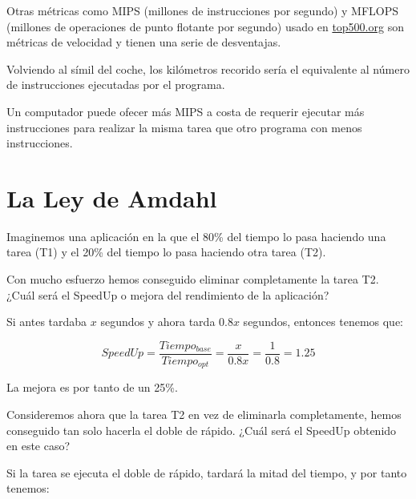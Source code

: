 \documentclass[12pt,onecolumn]{memoir}
\begin{document}
Otras métricas como MIPS (millones de instrucciones por segundo) y
MFLOPS (millones de operaciones de punto flotante por segundo) usado
en \url{top500.org} son métricas de velocidad y tienen una serie de
desventajas.

Volviendo al símil del coche, los kilómetros recorido sería el
equivalente al número de instrucciones ejecutadas por el programa.

Un computador puede ofecer más MIPS a costa de requerir ejecutar más
instrucciones para realizar la misma tarea que otro programa con menos
instrucciones.

\section{La Ley de Amdahl}

Imaginemos una aplicación en la que el 80\% del tiempo lo pasa
haciendo una tarea (T1) y el 20\% del tiempo lo pasa haciendo otra
tarea (T2).

\begin{center}
\end{center}

Con mucho esfuerzo hemos conseguido eliminar completamente la tarea
T2. ¿Cuál será el SpeedUp o mejora del rendimiento de la aplicación?

Si antes tardaba $x$ segundos y ahora tarda 0.8$x$ segundos, entonces
tenemos que:

\[ SpeedUp = \frac{Tiempo_{base}}{Tiempo_{opt}} = \frac{x}{0.8x} = \frac{1}{0.8} = 1.25 \]

La mejora es por tanto de un 25\%.

Consideremos ahora que la tarea T2 en vez de eliminarla completamente,
hemos conseguido tan solo hacerla el doble de rápido. ¿Cuál será el
SpeedUp obtenido en este caso?

Si la tarea se ejecuta el doble de
rápido, tardará la mitad del tiempo, y por tanto tenemos:
\end{document}
